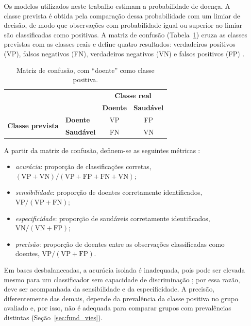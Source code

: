 Os modelos utilizados neste trabalho estimam a probabilidade de doença. A classe prevista é obtida pela comparação dessa probabilidade com um limiar de decisão, de modo que observações com probabilidade igual ou superior ao limiar são classificadas como positivas. A matriz de confusão (Tabela~\ref{tab:matriz_confusao}) cruza as classes previstas com as classes reais e define quatro resultados: verdadeiros positivos (VP), falsos negativos (FN), verdadeiros negativos (VN) e falsos positivos (FP) \cite{FAWCETT2006861}.

\begin{table}[htbp]
\centering
\begin{tabular}{llcc}
\hline
 & & \multicolumn{2}{c}{\textbf{Classe real}} \\
 & & \textbf{Doente} & \textbf{Saudável} \\
\hline
\multirow{2}{*}{\textbf{Classe prevista}} & \textbf{Doente} & VP & FP \\
 & \textbf{Saudável} & FN & VN \\
\hline
\end{tabular}
\caption{Matriz de confusão, com ``doente'' como classe positiva.}
\label{tab:matriz_confusao}
\end{table}

A partir da matriz de confusão, definem-se as seguintes métricas \cite{FAWCETT2006861}:

\begin{itemize}
    \item \textit{acurácia}: proporção de classificações corretas, $(\mathrm{VP} + \mathrm{VN}) / (\mathrm{VP} + \mathrm{FP} + \mathrm{FN} + \mathrm{VN})$;
    \item \textit{sensibilidade}: proporção de doentes corretamente identificados, $\mathrm{VP} / (\mathrm{VP} + \mathrm{FN})$;
    \item \textit{especificidade}: proporção de saudáveis corretamente identificados, $\mathrm{VN} / (\mathrm{VN} + \mathrm{FP})$;
    \item \textit{precisão}: proporção de doentes entre as observações classificadas como doentes, $\mathrm{VP} / (\mathrm{VP} + \mathrm{FP})$.
\end{itemize}

Em bases desbalanceadas, a acurácia isolada é inadequada, pois pode ser elevada mesmo para um classificador sem capacidade de discriminação \cite{FAWCETT2006861}; por essa razão, deve ser acompanhada da sensibilidade e da especificidade. A precisão, diferentemente das demais, depende da prevalência da classe positiva no grupo avaliado e, por isso, não é adequada para comparar grupos com prevalências distintas (Seção~\ref{sec:fund_vies}).

